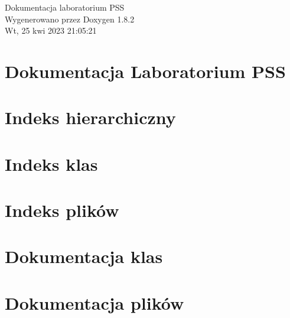 \documentclass{book}
\begin{document}
\hypersetup{pageanchor=false,citecolor=blue}
\begin{titlepage}
\vspace*{7cm}
\begin{center}
{\Large Dokumentacja laboratorium P\-S\-S }\\
\vspace*{1cm}
{\large Wygenerowano przez Doxygen 1.8.2}\\
\vspace*{0.5cm}
{\small Wt, 25 kwi 2023 21:05:21}\\
\end{center}
\end{titlepage}
\clearemptydoublepage
{}
\tableofcontents
\clearemptydoublepage
{}
\hypersetup{pageanchor=true,citecolor=blue}
\chapter{Dokumentacja Laboratorium P\-S\-S}
\label{md_README}
\hypertarget{md_README}{}

\chapter{Indeks hierarchiczny}

\chapter{Indeks klas}

\chapter{Indeks plików}

\chapter{Dokumentacja klas}


\chapter{Dokumentacja plików}





\printindex
\end{document}
